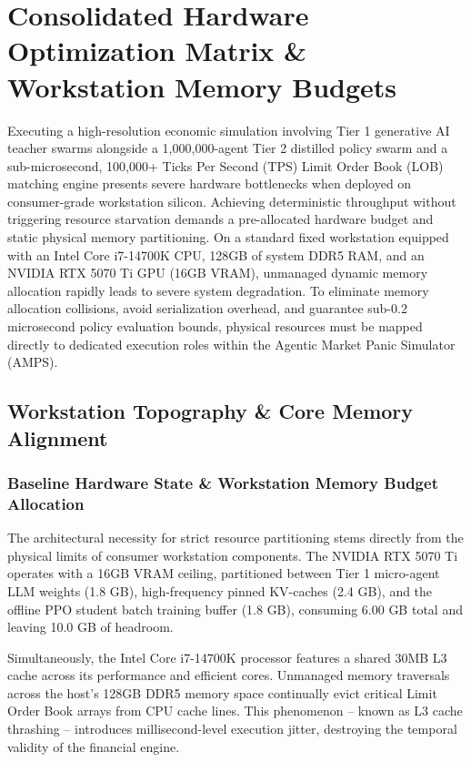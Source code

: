 \chapter{Consolidated Hardware Optimization Matrix \& Workstation Memory Budgets}
\label{ch:hardware_optimization_blueprint}
\label{app:hardware_blueprint}

Executing a high-resolution economic simulation involving Tier 1 generative AI teacher swarms alongside a 1,000,000-agent Tier 2 distilled policy swarm and a sub-microsecond, 100,000+ Ticks Per Second (TPS) Limit Order Book (LOB) matching engine presents severe hardware bottlenecks when deployed on consumer-grade workstation silicon. Achieving deterministic throughput without triggering resource starvation demands a pre-allocated hardware budget and static physical memory partitioning. On a standard fixed workstation equipped with an Intel Core i7-14700K CPU, 128GB of system DDR5 RAM, and an NVIDIA RTX 5070 Ti GPU (16GB VRAM), unmanaged dynamic memory allocation rapidly leads to severe system degradation. To eliminate memory allocation collisions, avoid serialization overhead, and guarantee sub-0.2 microsecond policy evaluation bounds, physical resources must be mapped directly to dedicated execution roles within the Agentic Market Panic Simulator (AMPS).

\section{Workstation Topography \& Core Memory Alignment}

\subsection{Baseline Hardware State \& Workstation Memory Budget Allocation}

The architectural necessity for strict resource partitioning stems directly from the physical limits of consumer workstation components. The NVIDIA RTX 5070 Ti operates with a 16GB VRAM ceiling, partitioned between Tier 1 micro-agent LLM weights (1.8 GB), high-frequency pinned KV-caches (2.4 GB), and the offline PPO student batch training buffer (1.8 GB), consuming 6.00 GB total and leaving 10.0 GB of headroom. 

Simultaneously, the Intel Core i7-14700K processor features a shared 30MB L3 cache across its performance and efficient cores. Unmanaged memory traversals across the host's 128GB DDR5 memory space continually evict critical Limit Order Book arrays from CPU cache lines. This phenomenon -- known as L3 cache thrashing -- introduces millisecond-level execution jitter, destroying the temporal validity of the financial engine.

